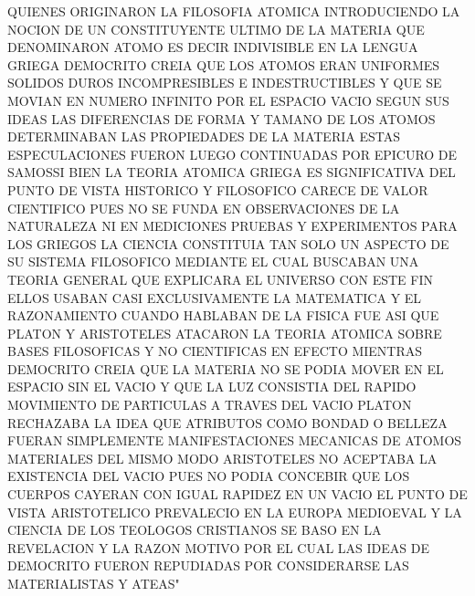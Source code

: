 \documentclass[12pt, letterpaper]{article}
\begin{document}
QUIENES ORIGINARON LA FILOSOFIA ATOMICA INTRODUCIENDO LA NOCION DE UN CONSTITUYENTE ULTIMO DE LA MATERIA QUE DENOMINARON ATOMO ES DECIR INDIVISIBLE EN LA LENGUA GRIEGA DEMOCRITO CREIA QUE LOS ATOMOS ERAN UNIFORMES SOLIDOS DUROS INCOMPRESIBLES E INDESTRUCTIBLES Y QUE SE MOVIAN EN NUMERO INFINITO POR EL ESPACIO VACIO SEGUN SUS IDEAS LAS DIFERENCIAS DE FORMA Y TAMANO DE LOS ATOMOS DETERMINABAN LAS PROPIEDADES DE LA MATERIA ESTAS ESPECULACIONES FUERON LUEGO CONTINUADAS POR EPICURO DE SAMOSSI BIEN LA TEORIA ATOMICA GRIEGA ES SIGNIFICATIVA DEL PUNTO DE VISTA HISTORICO Y FILOSOFICO CARECE DE VALOR CIENTIFICO PUES NO SE FUNDA EN OBSERVACIONES DE LA NATURALEZA NI EN MEDICIONES PRUEBAS Y EXPERIMENTOS PARA LOS GRIEGOS LA CIENCIA CONSTITUIA TAN SOLO UN ASPECTO DE SU SISTEMA FILOSOFICO MEDIANTE EL CUAL BUSCABAN UNA TEORIA GENERAL QUE EXPLICARA EL UNIVERSO CON ESTE FIN ELLOS USABAN CASI EXCLUSIVAMENTE LA MATEMATICA Y EL RAZONAMIENTO CUANDO HABLABAN DE LA FISICA FUE ASI QUE PLATON Y ARISTOTELES ATACARON LA TEORIA ATOMICA SOBRE BASES FILOSOFICAS Y NO CIENTIFICAS EN EFECTO MIENTRAS DEMOCRITO CREIA QUE LA MATERIA NO SE PODIA MOVER EN EL ESPACIO SIN EL VACIO Y QUE LA LUZ CONSISTIA DEL RAPIDO MOVIMIENTO DE PARTICULAS A TRAVES DEL VACIO PLATON RECHAZABA LA IDEA QUE ATRIBUTOS COMO BONDAD O BELLEZA FUERAN SIMPLEMENTE MANIFESTACIONES MECANICAS DE ATOMOS MATERIALES DEL MISMO MODO ARISTOTELES NO ACEPTABA LA EXISTENCIA DEL VACIO PUES NO PODIA CONCEBIR QUE LOS CUERPOS CAYERAN CON IGUAL RAPIDEZ EN UN VACIO EL PUNTO DE VISTA ARISTOTELICO PREVALECIO EN LA EUROPA MEDIOEVAL Y LA CIENCIA DE LOS TEOLOGOS CRISTIANOS SE BASO EN LA REVELACION Y LA RAZON MOTIVO POR EL CUAL LAS IDEAS DE DEMOCRITO FUERON REPUDIADAS POR CONSIDERARSE LAS MATERIALISTAS Y ATEAS"
\end{document}
